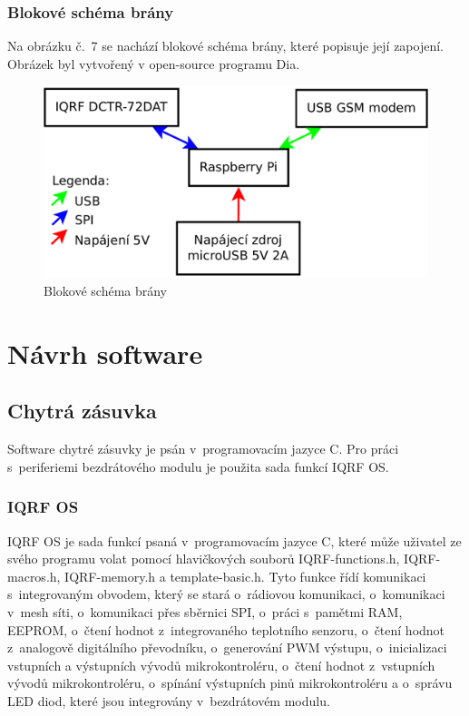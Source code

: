 \documentclass[12pt,a4paper,oneside]{article}
\begin{document}
\newpage

\subsubsection{Blokové schéma brány}

Na obrázku č.~7 se nachází blokové schéma brány, které popisuje její zapojení. Obrázek byl vytvořený v open-source programu Dia\cite{sw/dia}.

\begin{figure}[H]
\centering
\label{fig:blokove-schema-zasuvky}
\includegraphics[width = 128mm]{img/blokove-schema-brany.pdf}
\caption{Blokové schéma brány}
\end{figure}

\newpage

\section{Návrh software}

\subsection{Chytrá zásuvka}

Software chytré zásuvky je psán v~programovacím jazyce C. Pro práci s~periferiemi bezdrátového modulu je použita sada funkcí IQRF OS. 

\subsubsection{IQRF OS}

IQRF OS je sada funkcí psaná v~programovacím jazyce C, které může uživatel ze svého programu volat pomocí hlavičkových souborů IQRF-functions.h, IQRF-macros.h, IQRF-memory.h a template-basic.h. Tyto funkce řídí komunikaci s~integrovaným obvodem, který se stará o~rádiovou komunikaci, o~komunikaci v~mesh síti, o~komunikaci přes sběrnici SPI, o~práci s~pamětmi RAM, EEPROM, o~čtení hodnot z~integrovaného teplotního senzoru, o~čtení hodnot z~analogově digitálního převodníku, o~generování PWM výstupu, o~inicializaci vstupních a výstupních vývodů mikrokontroléru, o~čtení hodnot z~vstupních vývodů mikrokontroléru, o~spínání výstupních pinů mikrokontroléru a o~správu LED diod, které jsou integrovány v~bezdrátovém modulu. 
\end{document}
